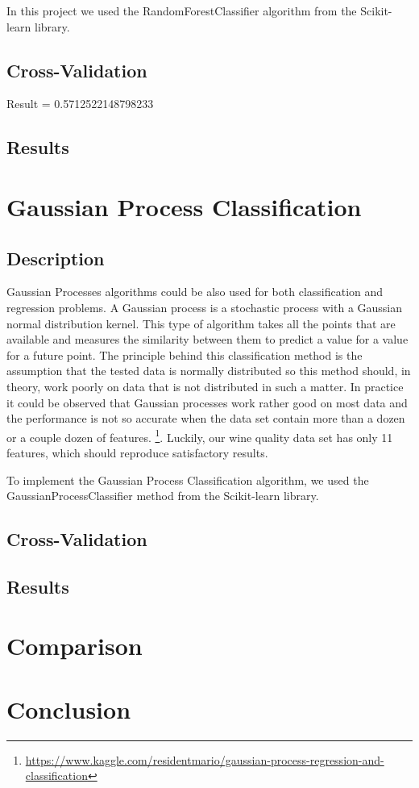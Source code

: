 \documentclass[twocolumn]{scrartcl}
\begin{document}
In this project we used the RandomForestClassifier algorithm from the Scikit-learn library.

\subsection{Cross-Validation}
Result = 0.5712522148798233
\subsection{Results}

\section{Gaussian Process Classification}
\subsection{Description}
Gaussian Processes algorithms could be also used for both classification and regression problems. A Gaussian process is a stochastic process with a Gaussian normal distribution kernel. This type of algorithm takes all the points that are available and measures the similarity between them to predict a value for a value for a future point.
The principle behind this classification method is the assumption that the tested data is normally distributed so this method should, in theory, work poorly on data that is not distributed in such a matter. In practice it could be observed that Gaussian processes work rather good on most data and the performance is not so accurate when the data set contain more than a dozen or a couple dozen of features.
\footnote{\url{https://www.kaggle.com/residentmario/gaussian-process-regression-and-classification}}.
Luckily, our wine quality data set has only 11 features, which should reproduce satisfactory results.

To implement the Gaussian Process Classification algorithm, we used the GaussianProcessClassifier method from the Scikit-learn library.


\subsection{Cross-Validation}
\subsection{Results}

\section{Comparison}
\section{Conclusion}

\printbibliography
\end{document}
